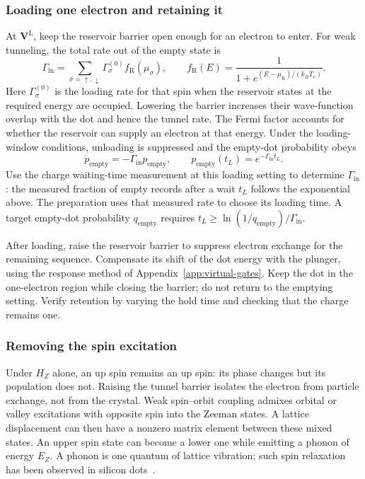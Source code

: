 \subsubsection{Loading one electron and retaining it}
At $\mathbf V^{\mathrm L}$, keep the reservoir barrier open enough
for an electron to enter. For weak tunneling, the total rate out
of the empty state is
\[
 \Gamma_{\mathrm{in}}
 =\sum_{\sigma=\uparrow,\downarrow}
        \Gamma_\sigma^{(0)}f_{\mathrm R}(\mu_\sigma),\qquad
 f_{\mathrm R}(E)=\frac{1}{1+e^{(E-\mu_{\mathrm R})/(k_BT_e)}}.
\]
Here $\Gamma_\sigma^{(0)}$ is the loading rate for that spin when
the reservoir states at the required energy are occupied.
Lowering the barrier increases their wave-function overlap with
the dot and hence the tunnel rate. The Fermi factor accounts for
whether the reservoir can supply an electron at that energy. Under the
loading-window conditions, unloading is suppressed and the
empty-dot probability obeys
\[
 \dot p_{\mathrm{empty}}=-\Gamma_{\mathrm{in}}p_{\mathrm{empty}},
 \qquad p_{\mathrm{empty}}(t_L)=e^{-\Gamma_{\mathrm{in}}t_L}.
\]
Use the charge waiting-time measurement at this loading setting to
determine $\Gamma_{\mathrm{in}}$: the measured fraction of empty
records after a wait $t_L$ follows the exponential above.
The preparation uses that measured rate to choose its loading time.
A target empty-dot probability $q_{\mathrm{empty}}$ requires
$t_L\ge\ln(1/q_{\mathrm{empty}})/\Gamma_{\mathrm{in}}$.

After loading, raise the reservoir barrier to suppress electron
exchange for the remaining sequence. Compensate its shift of the
dot energy with the plunger, using the response method of
Appendix~\ref{app:virtual-gates}. Keep the dot in
the one-electron region while closing the barrier; do not return
to the emptying setting. Verify retention by varying the hold
time and checking that the charge remains one.

\subsubsection{Removing the spin excitation}
Under $H_Z$ alone, an up spin remains an up spin: its phase changes
but its population does not. Raising the tunnel barrier isolates
the electron from particle exchange, not from the crystal.
Weak spin--orbit coupling admixes orbital or valley excitations
with opposite spin into the Zeeman states. A lattice displacement
can then have a nonzero matrix element between these mixed states.
An upper spin state can become a lower one while emitting a phonon
of energy $E_Z$. A phonon is one quantum of
lattice vibration; such spin relaxation has been observed in
silicon dots~\cite{Yang2013SpinValley}.

